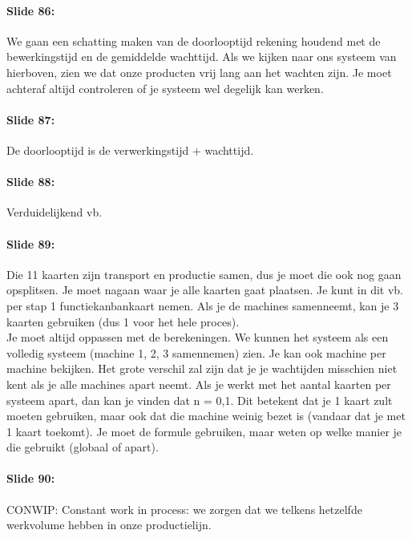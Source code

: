 \documentclass[10pt,a4paper]{report}
\begin{document}
\paragraph{Slide 86:} We gaan een schatting maken van de doorlooptijd rekening houdend met de bewerkingstijd en de gemiddelde wachttijd. Als we kijken naar ons systeem van hierboven, zien we dat onze producten vrij lang aan het wachten zijn. Je moet achteraf altijd controleren of je systeem wel degelijk kan werken. 

\paragraph{Slide 87:} De doorlooptijd is de verwerkingstijd + wachttijd.

\paragraph{Slide 88:} Verduidelijkend vb. 

\paragraph{Slide 89:} Die 11 kaarten zijn transport en productie samen, dus je moet die ook nog gaan opsplitsen. Je moet nagaan waar je alle kaarten gaat plaatsen. Je kunt in dit vb. per stap 1 functiekanbankaart nemen. Als je de machines samenneemt, kan je 3 kaarten gebruiken (dus 1 voor het hele proces).\\
Je moet altijd oppassen met de berekeningen. We kunnen het systeem als een volledig systeem (machine 1, 2, 3 samennemen) zien. Je kan ook machine per machine bekijken. Het grote verschil zal zijn dat je je wachtijden misschien niet kent als je alle machines apart neemt. Als je werkt met het aantal kaarten per systeem apart, dan kan je vinden dat n = 0,1. Dit betekent dat je 1 kaart zult moeten gebruiken, maar ook dat die machine weinig bezet is (vandaar dat je met 1 kaart toekomt). Je moet de formule gebruiken, maar weten op welke manier je die gebruikt (globaal of apart).

\paragraph{Slide 90:} CONWIP: Constant work in process: we zorgen dat we telkens hetzelfde werkvolume hebben in onze productielijn.
\end{document}
